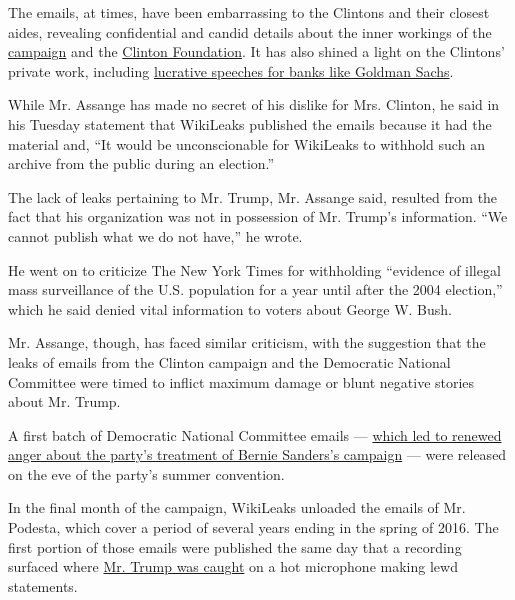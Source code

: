 The emails, at times, have been embarrassing to the Clintons and their
closest aides, revealing confidential and candid details about the inner
workings of the
\href{http://www.nytimes.com/2016/10/11/us/politics/hillary-clinton-emails.html}{campaign}
and the
\href{mailto:http://www.nytimes.com/2016/10/27/us/politics/bill-hillary-clinton-foundation-wikileaks.html}{Clinton
Foundation}. It has also shined a light on the Clintons' private work,
including
\href{http://www.nytimes.com/2016/10/16/us/politics/wikileaks-hack-hillary-clinton-emails.html?action=click\&contentCollection=Politics\&module=RelatedCoverage\&region=Marginalia\&pgtype=article}{lucrative
speeches for banks like Goldman Sachs}.

While Mr. Assange has made no secret of his dislike for Mrs. Clinton, he
said in his Tuesday statement that WikiLeaks published the emails
because it had the material and, ``It would be unconscionable for
WikiLeaks to withhold such an archive from the public during an
election.''

The lack of leaks pertaining to Mr. Trump, Mr. Assange said, resulted
from the fact that his organization was not in possession of Mr. Trump's
information. ``We cannot publish what we do not have,'' he wrote.

He went on to criticize The New York Times for withholding ``evidence of
illegal mass surveillance of the U.S. population for a year until after
the 2004 election,'' which he said denied vital information to voters
about George W. Bush.

Mr. Assange, though, has faced similar criticism, with the suggestion
that the leaks of emails from the Clinton campaign and the Democratic
National Committee were timed to inflict maximum damage or blunt
negative stories about Mr. Trump.

A first batch of Democratic National Committee emails ---
\href{http://www.nytimes.com/2016/07/25/us/politics/debbie-wasserman-schultz-dnc-wikileaks-emails.html}{which
led to renewed anger about the party's treatment of Bernie Sanders's
campaign} --- were released on the eve of the party's summer convention.

In the final month of the campaign, WikiLeaks unloaded the emails of Mr.
Podesta, which cover a period of several years ending in the spring of
2016. The first portion of those emails were published the same day that
a recording surfaced where
\href{http://www.nytimes.com/2016/10/08/us/politics/donald-trump-women.html}{Mr.
Trump was caught} on a hot microphone making lewd statements.

